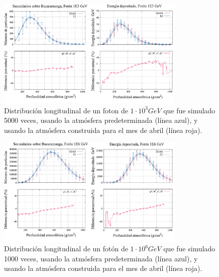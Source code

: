 \begin{figure}[htb!]
\centering
\includegraphics[width=0.8\textwidth]{images/foton_1E3.pdf}
\caption[Distribución longitudinal de un fotón de $1\cdot 10^{3}$ GeV.]{Distribución longitudinal de un foton de $1\cdot 10^{3} GeV$ que fue simulado 5000 veces, usando la atmósfera predeterminada (línea azul), y usando la atmósfera construida para el mes de abril (línea roja).}
\label{fig:fig30}
\end{figure}

\begin{figure}[htb!]
\centering
\includegraphics[width=0.8\textwidth]{images/foton_1E6.pdf}
\caption[Distribución longitudinal de un fotón de $1\cdot 10^{6}$ GeV.]{Distribución longitudinal de un fotón de $1\cdot 10^{6} GeV$ que fue simulado 1000 veces, usando la atmósfera predeterminada (línea azul), y usando la atmósfera construida para el mes de abril (línea roja). }
\label{fig:fig31}
\end{figure}

